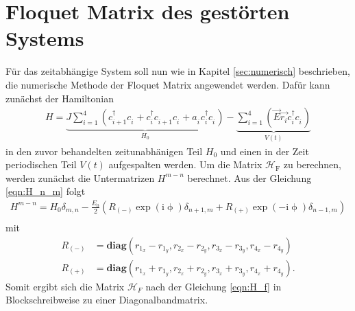 \section{Floquet Matrix des gestörten Systems}
Für das zeitabhängige System soll nun wie
in Kapitel \ref{sec:numerisch} beschrieben, die
numerische Methode der Floquet Matrix angewendet werden.
Dafür kann zunächst der Hamiltonian
\begin{align}
H=\underbrace{J\sum_{i=1}^4 \left(c_{i+1}^\dag c_i^{\phantom{\dag}} + c_{i}^\dag c_{i+1}^{\phantom{\dag}}c_i^{\phantom{\dag}} + a_i^{\phantom{\dag}} c_i^\dag c_i^{\phantom{\dag}}
 \right)}_{H_0} -\underbrace{\sum_{i=1}^4\left(\vec{E} \vec{r_i}  c_i^\dag c_i^{\phantom{\dag}}\right)}_{V(t)}
\end{align}
in den zuvor behandelten zeitunabhänigen Teil $H_0$ und einen in der Zeit periodischen Teil $V(t)$ aufgespalten werden.
Um die Matrix $\mathcal{H}_\mathrm{F}$ zu berechnen, werden zunächst die Untermatrizen $H^{m-n}$ berechnet.
Aus der Gleichung \eqref{eqn:H_n_m} folgt
\begin{align}
  H^{m-n}=H_0\delta_{m,n} -\frac{E_0}{2}\left(R_{(-)} \exp\left( \mathrm{i}\upphi\right)\delta_{n+1,m}   +  R_{(+)}\exp\left( -\mathrm{i}\upphi\right)\delta_{n-1,m}\right)\\
\end{align}
mit
\begin{align}
  R_{(-)}&=\textbf{diag}\left(
  r_{1_x}-r_{1_y} ,
  r_{2_x}-r_{2_y} ,
  r_{3_x}-r_{3_y} ,
  r_{4_x}-r_{4_y}\right)
\\
R_{(+)}&= \textbf{diag}\left(
r_{1_x}+r_{1_y} ,
r_{2_x}+r_{2_y} ,
r_{3_x}+r_{3_y} ,
r_{4_x}+r_{4_y}\right).
\end{align}
Somit ergibt sich die Matrix $\mathcal{H}_F$ nach
der Gleichung \eqref{eqn:H_f} in
Blockschreibweise zu einer Diagonalbandmatrix.
